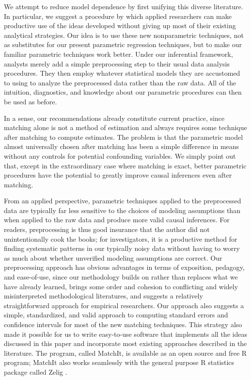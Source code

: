 \documentclass[11pt,titlepage]{article}
\begin{document}
We attempt to reduce model dependence by first unifying this diverse
literature.  In particular, we suggest a procedure by which applied
researchers can make productive use of the ideas developed without
giving up most of their existing analytical strategies.  Our idea is
to use these new nonparametric techniques, not as substitutes for our
present parametric regression techniques, but to make our familiar
parametric techniques work better.  Under our inferential framework,
analysts merely add a simple preprocessing step to their usual data
analysis procedures.  They then employ whatever statistical models
they are accustomed to using to analyze the preprocessed data rather
than the raw data.  All of the intuition, diagnostics, and knowledge
about our parametric procedures can then be used as before.

In a sense, our recommendations already constitute current practice,
since matching alone is not a method of estimation and always requires
some technique after matching to compute estimates.  The problem is
that the parametric model almost universally chosen after matching has
been a simple difference in means without any controls for potential
confounding variables.  We simply point out that, except in the
extraordinary case where matching is exact, better parametric
procedures have the potential to greatly improve causal inferences
even after matching.

From an applied perspective, parametric techniques applied to the
preprocessed data are typically far less sensitive to the choices of
modeling assumptions than when applied to the raw data and produce
more valid causal inferences.  For readers, preprocessing is thus good
insurance that the author did not unintentionally cook the books; for
investigators, it is a productive method for finding systematic
patterns in our typically noisy data without having to worry as much
about whether unverified modeling assumptions are correct.  Our
preprocessing approach has obvious advantages in terms of exposition,
pedagogy, and ease-of-use, since our methodology builds on rather than
replaces what we have already learned, brings some order and cohesion
to conflicting and widely misinterpreted methodological literatures,
and suggests a relatively straightforward approach for empirical
researchers. Our approach also suggests a simple, standardized, and
valid approach to computing standard errors and confidence intervals
for most of the new matching techniques.  This strategy also made it
possible for us to write easy-to-use software that implements all the
ideas discussed in this paper and incorporate most existing
approaches described in the literature.  The program, called MatchIt,
is available as an open source and free R program; MatchIt also works
seamlessly with the general purpose R statistics package called Zelig
\citep{ImaKinLau04}.
\end{document}
